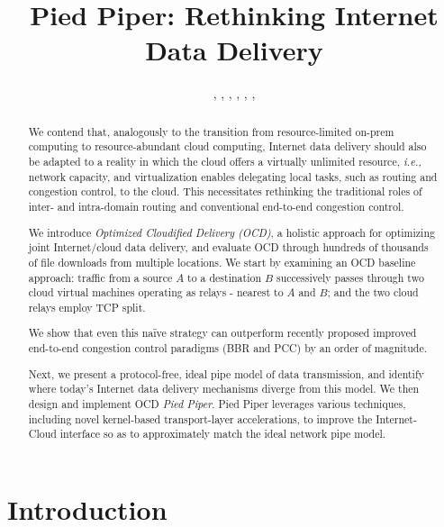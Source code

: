 \documentclass[newfonts=false,format=sigconf,10pt,letterpaper]{acmart}
\title{Pied Piper: Rethinking Internet Data Delivery}
\author{
  \aut{Aran Bergman}{1,2},
  \aut{Israel Cidon}{1},
  \aut{Isaac Keslassy}{1,2},
  \aut{Noga Rotman}{3},
  \aut{Michael Schapira}{3},
  \aut{Alex Markuze}{1,2},
  \aut{Eyal Zohar}{1}
}%
\affiliation{
$^1$ \textit{VMware} \quad 
$^2$ \textit{Technion} \quad 
$^3$ \textit{HUJI} \quad 
	}
\date{}
\providecommand{\ie}{\emph{i.e.,} }
\newcommand{\name}{Pied Piper\xspace}
\begin{document}
 \sloppypar


\begin{abstract}

We contend that, analogously to the transition from resource-limited on-prem computing to resource-abundant cloud computing, Internet data delivery should also be adapted to a reality in which the cloud offers a virtually unlimited resource, \ie network capacity, and virtualization enables delegating local tasks, such as routing and congestion control, to the cloud. This necessitates rethinking the traditional roles of  inter- and intra-domain routing and conventional end-to-end congestion control.

We introduce \textit{Optimized Cloudified Delivery (OCD)}, a holistic approach for optimizing joint Internet/cloud data delivery, and evaluate OCD through hundreds of thousands of file downloads from multiple locations. We start by examining an OCD baseline approach:  traffic from a source $A$ to a destination $B$ successively passes through two cloud virtual machines operating as relays - nearest to $A$ and $B$; and the two cloud relays employ TCP split.

We show that even this na\"ive strategy can outperform recently proposed improved end-to-end congestion control paradigms (BBR and PCC) by an order of magnitude.

Next, we present a protocol-free, ideal pipe model of data transmission, 
and identify where today's Internet data delivery mechanisms diverge from this model. We then design and implement OCD \textit{\name}. \name leverages various techniques, including novel kernel-based transport-layer accelerations, to improve the Internet-Cloud interface so as to approximately match the ideal network pipe model.
\end{abstract}




\maketitle





\section{Introduction}

{\let\thefootnote\relax{}}
\end{document}
